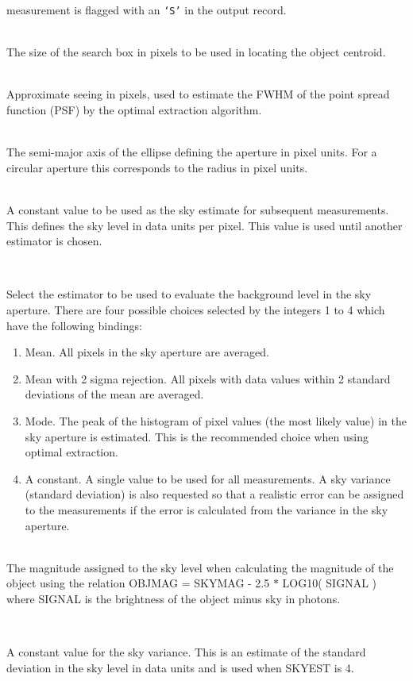 \documentclass[twoside,11pt]{article}
\renewcommand{\_}{\texttt{\symbol{95}}}
\newcommand{\st}[1]{\texttt{`#1'}}
\newcommand{\sstsubsection}[1]{ \item[{#1}] \mbox{} \\}
\newcommand{\sstsubsection}[1]{\item[{#1}]}
\begin{document}
{{{         measurement is flagged with an \st{S} in the output record.
      }
      \sstsubsection{
         SEARCH = \_INTEGER (Read)
      }{
         The size of the search box in pixels to be used in locating the
         object centroid.
      }
      \sstsubsection{
         SEE = \_REAL (Read)
      }{
         Approximate seeing in pixels, used to estimate the FWHM of the
         point spread function (PSF) by the optimal extraction algorithm.
      }                 
      \sstsubsection{
         SEMIM = \_REAL (Read)
      }{
         The semi-major axis of the ellipse defining the aperture in
         pixel units. For a circular aperture this corresponds to the
         radius in pixel units.
      }
      \sstsubsection{
         SKY = \_REAL (Read)
      }{
         A constant value to be used as the sky estimate for subsequent
         measurements. This defines the sky level in data units per
         pixel. This value is used until another estimator is chosen.
      }
      \sstsubsection{
         SKYEST = \_INTEGER (Read)
      }{
         Select the estimator to be used to evaluate the background
         level in the sky aperture. There are four possible choices
         selected by the integers 1 to 4 which have the following
         bindings:
         \begin{enumerate}
         \item Mean. All pixels in the sky aperture are averaged.
         \item Mean with 2 sigma rejection. All pixels with data values
               within 2 standard deviations of the mean are averaged.
         \item Mode. The peak of the histogram of pixel values (the most
               likely value) in the sky aperture is estimated. This is
               the recommended choice when using optimal extraction.
         \item A constant. A single value to be used for all
            measurements. A sky variance (standard deviation) is
            also requested so that a realistic error can be assigned
            to the measurements if the error is calculated from the
            variance in the sky aperture.
         \end{enumerate}
      }
      \sstsubsection{
         SKYMAG = \_REAL (Read)
      }{
         The magnitude assigned to the sky level when calculating the
         magnitude of the object using the relation
         OBJMAG = SKYMAG - 2.5 $*$ LOG10( SIGNAL )
         where SIGNAL is the brightness of the object minus sky in
         photons.
      }
      \sstsubsection{
         SKYSIG = \_REAL (Read)
      }{
        A constant value for the sky variance. This is an estimate of
        the standard deviation in the sky level in data units and is
        used when SKYEST is 4.

}}}
\end{document}
